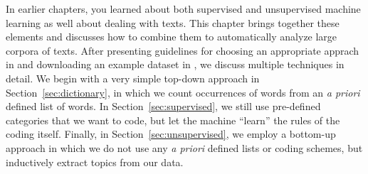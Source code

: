 In earlier chapters, you learned about both supervised and unsupervised machine learning as well about dealing with texts.
This chapter brings together these elements and discusses how to combine them to automatically analyze large corpora of texts. After presenting guidelines for choosing an appropriate apprach in  and downloading an example dataset in , we discuss multiple techniques in detail.
We begin with a very simple top-down approach in Section~\ref{sec:dictionary}, in which we count occurrences of words from an \emph{a priori} defined list of words. In Section~\ref{sec:supervised}, we still use pre-defined categories that we want to code, but let the machine ``learn'' the rules of the coding itself. Finally, in Section~\ref{sec:unsupervised}, we employ a bottom-up approach in which we do not use any \emph{a priori} defined lists or coding schemes, but inductively extract topics from our data.












